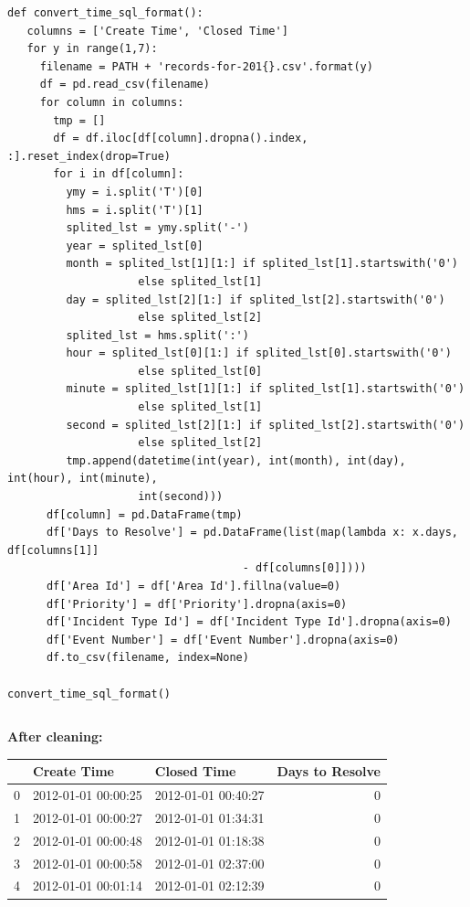 \documentclass{article} %
\begin{document}
\begin{itemize}
\lstset{language=python}
\lstset{showstringspaces=false}
\lstset{frame=lines}
\lstset{basicstyle=\footnotesize}
\begin{lstlisting}
def convert_time_sql_format():
   columns = ['Create Time', 'Closed Time']
   for y in range(1,7):
     filename = PATH + 'records-for-201{}.csv'.format(y)
     df = pd.read_csv(filename)
     for column in columns:
       tmp = []
       df = df.iloc[df[column].dropna().index, :].reset_index(drop=True)
       for i in df[column]:
         ymy = i.split('T')[0]
         hms = i.split('T')[1]
         splited_lst = ymy.split('-')
         year = splited_lst[0]
         month = splited_lst[1][1:] if splited_lst[1].startswith('0')
					else splited_lst[1]
         day = splited_lst[2][1:] if splited_lst[2].startswith('0')
					else splited_lst[2]
         splited_lst = hms.split(':')
         hour = splited_lst[0][1:] if splited_lst[0].startswith('0')
					else splited_lst[0]
         minute = splited_lst[1][1:] if splited_lst[1].startswith('0')
					else splited_lst[1]
         second = splited_lst[2][1:] if splited_lst[2].startswith('0')
					else splited_lst[2]
         tmp.append(datetime(int(year), int(month), int(day), int(hour), int(minute), 
         			int(second)))
      df[column] = pd.DataFrame(tmp)
      df['Days to Resolve'] = pd.DataFrame(list(map(lambda x: x.days, df[columns[1]] 
      								- df[columns[0]])))
      df['Area Id'] = df['Area Id'].fillna(value=0)
      df['Priority'] = df['Priority'].dropna(axis=0)
      df['Incident Type Id'] = df['Incident Type Id'].dropna(axis=0)
      df['Event Number'] = df['Event Number'].dropna(axis=0)
      df.to_csv(filename, index=None)

convert_time_sql_format()
\end{lstlisting}
\[\]

\textbf{After cleaning:}

\begin{tabular}{|l|l|l|r|}
	\toprule
	{} &          Create Time &          Closed Time &  Days to Resolve \\
	\midrule
	0 &  2012-01-01 00:00:25 &  2012-01-01 00:40:27 &                0 \\
	1 &  2012-01-01 00:00:27 &  2012-01-01 01:34:31 &                0 \\
	2 &  2012-01-01 00:00:48 &  2012-01-01 01:18:38 &                0 \\
	3 &  2012-01-01 00:00:58 &  2012-01-01 02:37:00 &                0 \\
	4 &  2012-01-01 00:01:14 &  2012-01-01 02:12:39 &                0 \\
	\bottomrule
\end{tabular}


\end{itemize}
\end{document}
